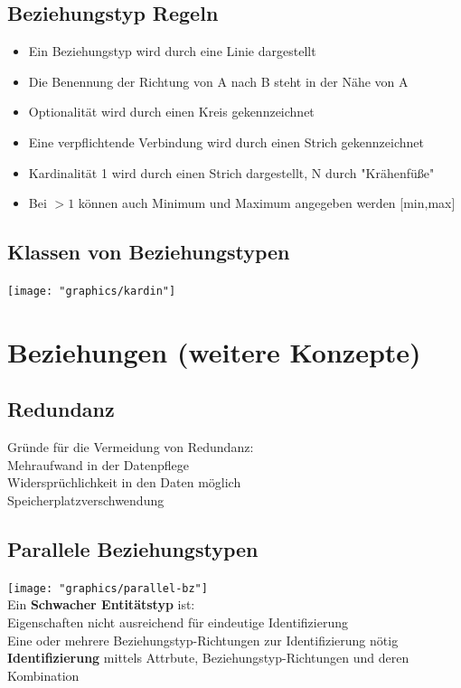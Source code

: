 \documentclass{scrreprt}
\newcommand\tab[1][1cm]{\hspace*{#1}}
\begin{document}
\subsection{Beziehungstyp Regeln}
\begin{itemize}
  \item Ein Beziehungstyp wird durch eine Linie dargestellt
  \item Die Benennung der Richtung von A nach B steht in der Nähe von A
  \item Optionalität wird durch einen Kreis gekennzeichnet
  \item Eine verpflichtende Verbindung wird durch einen Strich gekennzeichnet
  \item Kardinalität 1 wird durch einen Strich dargestellt, N durch "Krähenfüße"
  \item Bei $>1$ können auch Minimum und Maximum angegeben werden [min,max]
\end{itemize}
\subsection{Klassen von Beziehungstypen}
\texttt{[image: "graphics/kardin"]}
\section{Beziehungen (weitere Konzepte)}
\subsection{Redundanz}
Gründe für die Vermeidung von Redundanz:
\\\tab Mehraufwand in der Datenpflege
\\\tab Widersprüchlichkeit in den Daten möglich 
\\\tab Speicherplatzverschwendung
\subsection{Parallele Beziehungstypen}
\texttt{[image: "graphics/parallel-bz"]}
\\ Ein \textbf{Schwacher Entitätstyp} ist:
\\\tab Eigenschaften nicht ausreichend für eindeutige Identifizierung
\\\tab Eine oder mehrere Beziehungstyp-Richtungen zur Identifizierung nötig
\\\textbf{Identifizierung} mittels Attrbute, Beziehungstyp-Richtungen und deren Kombination
\end{document}
